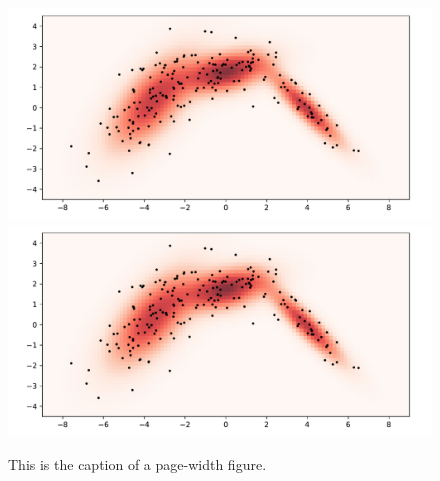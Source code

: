 \documentclass[10pt,twocolumn,letterpaper]{article}
\begin{document}
\begin{figure}
   \begin{center}
      \includegraphics[width=0.4\linewidth]{sample_image.pdf}
      \includegraphics[width=0.4\linewidth]{sample_image.pdf}
   \end{center}
      \caption{This is the caption of a page-width figure.\label{second_figure}}
\end{figure}





{\small


}
\end{document}
